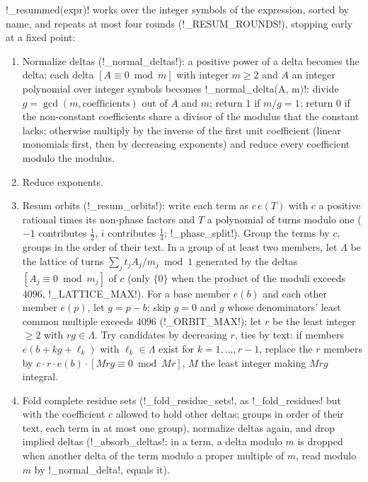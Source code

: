 \begin{algorithm}\label{alg:proofs-resum}
\py!_resummed(expr)! works over the integer symbols of the expression, sorted by name, and repeats at most four rounds (\py!_RESUM_ROUNDS!), stopping early at a fixed point:
\begin{enumerate}
\item Normalize deltas (\py!_normal_deltas!): a positive power of a delta becomes the delta; each delta $[A\equiv0\bmod m]$ with integer $m\ge2$ and $A$ an integer polynomial over integer symbols becomes \py!_normal_delta(A, m)!: divide $g=\gcd(m,\text{coefficients})$ out of $A$ and $m$; return $1$ if $m/g=1$; return $0$ if the non-constant coefficients share a divisor of the modulus that the constant lacks; otherwise multiply by the inverse of the first unit coefficient (linear monomials first, then by decreasing exponents) and reduce every coefficient modulo the modulus.
\item Reduce exponents.
\item Resum orbits (\py!_resum_orbits!): write each term as $c\,e(T)$ with $c$ a positive rational times its non-phase factors and $T$ a polynomial of turns modulo one ($-1$ contributes $\tfrac12$, $i$ contributes $\tfrac14$; \py!_phase_split!). Group the terms by $c$, groups in the order of their text. In a group of at least two members, let $\Lambda$ be the lattice of turns $\sum_j t_jA_j/m_j \bmod 1$ generated by the deltas $[A_j\equiv0\bmod m_j]$ of $c$ (only $\{0\}$ when the product of the moduli exceeds $4096$, \py!_LATTICE_MAX!). For a base member $e(b)$ and each other member $e(p)$, let $g=p-b$; skip $g=0$ and $g$ whose denominators' least common multiple exceeds $4096$ (\py!_ORBIT_MAX!); let $r$ be the least integer $\ge2$ with $rg\in\Lambda$. Try candidates by decreasing $r$, ties by text: if members $e(b+kg+\ell_k)$ with $\ell_k\in\Lambda$ exist for $k=1,\ldots,r-1$, replace the $r$ members by $c\cdot r\cdot e(b)\cdot[Mrg\equiv0\bmod Mr]$, $M$ the least integer making $Mrg$ integral.
\item Fold complete residue sets (\py!_fold_residue_sets!, as \py!_fold_residues! but with the coefficient $c$ allowed to hold other deltas; groups in order of their text, each term in at most one group), normalize deltas again, and drop implied deltas (\py!_absorb_deltas!: in a term, a delta modulo $m$ is dropped when another delta of the term modulo a proper multiple of $m$, read modulo $m$ by \py!_normal_delta!, equals it).
\end{enumerate}
\end{algorithm}


